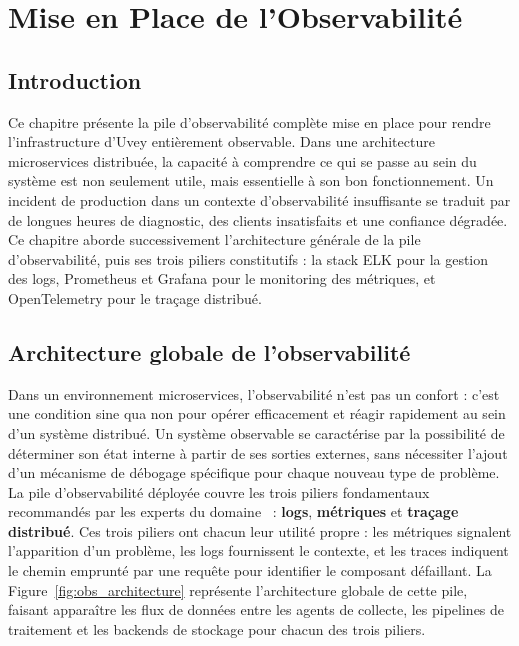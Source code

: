 \chapter{Mise en Place de l'Observabilité}
\label{chap:observabilite}

\section*{Introduction}

\noindent Ce chapitre présente la pile d'observabilité complète mise en place pour rendre l'infrastructure d'Uvey entièrement observable. Dans une architecture microservices distribuée, la capacité à comprendre ce qui se passe au sein du système est non seulement utile, mais essentielle à son bon fonctionnement. Un incident de production dans un contexte d'observabilité insuffisante se traduit par de longues heures de diagnostic, des clients insatisfaits et une confiance dégradée. Ce chapitre aborde successivement l'architecture générale de la pile d'observabilité, puis ses trois piliers constitutifs : la stack ELK pour la gestion des logs, Prometheus et Grafana pour le monitoring des métriques, et OpenTelemetry pour le traçage distribué.

\section{Architecture globale de l'observabilité}
\label{sec:obs_architecture}

\noindent Dans un environnement microservices, l'observabilité n'est pas un confort : c'est une condition sine qua non pour opérer efficacement et réagir rapidement au sein d'un système distribué. Un système observable se caractérise par la possibilité de déterminer son état interne à partir de ses sorties externes, sans nécessiter l'ajout d'un mécanisme de débogage spécifique pour chaque nouveau type de problème. La pile d'observabilité déployée couvre les trois piliers fondamentaux recommandés par les experts du domaine~\cite{sridharan2018distributed} : \textbf{logs}, \textbf{métriques} et \textbf{traçage distribué}. Ces trois piliers ont chacun leur utilité propre : les métriques signalent l'apparition d'un problème, les logs fournissent le contexte, et les traces indiquent le chemin emprunté par une requête pour identifier le composant défaillant. La Figure~\ref{fig:obs_architecture} représente l'architecture globale de cette pile, faisant apparaître les flux de données entre les agents de collecte, les pipelines de traitement et les backends de stockage pour chacun des trois piliers.


